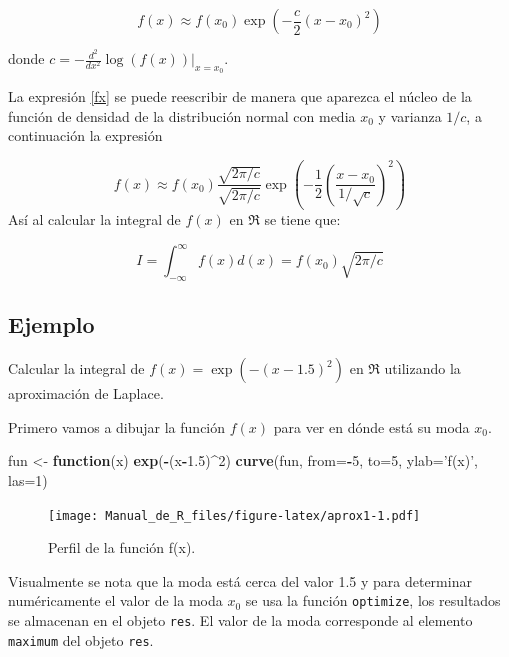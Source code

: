 \documentclass[10pt,]{krantz}
\makeatletter
\newenvironment{Shaded}{\begin{snugshade}}{\end{snugshade}}
\newcommand{\KeywordTok}[1]{\textcolor[rgb]{0.13,0.29,0.53}{\textbf{#1}}}
\newcommand{\DataTypeTok}[1]{\textcolor[rgb]{0.13,0.29,0.53}{#1}}
\newcommand{\DecValTok}[1]{\textcolor[rgb]{0.00,0.00,0.81}{#1}}
\newcommand{\FloatTok}[1]{\textcolor[rgb]{0.00,0.00,0.81}{#1}}
\newcommand{\StringTok}[1]{\textcolor[rgb]{0.31,0.60,0.02}{#1}}
\newcommand{\ControlFlowTok}[1]{\textcolor[rgb]{0.13,0.29,0.53}{\textbf{#1}}}
\newcommand{\OperatorTok}[1]{\textcolor[rgb]{0.81,0.36,0.00}{\textbf{#1}}}
\newcommand{\NormalTok}[1]{#1}
\newenvironment{kframe}{%
\medskip{}
\setlength{\fboxsep}{.8em}
 \def\at@end@of@kframe{}%
 \ifinner\ifhmode%
  \def\at@end@of@kframe{\end{minipage}}%
  \begin{minipage}{\columnwidth}%
 \fi\fi%
 \def\FrameCommand##1{\hskip\@totalleftmargin \hskip-\fboxsep
 \colorbox{shadecolor}{##1}\hskip-\fboxsep
     \hskip-\linewidth \hskip-\@totalleftmargin \hskip\columnwidth}%
 \MakeFramed {\advance\hsize-\width
   \@totalleftmargin\z@ \linewidth\hsize
   \@setminipage}}%
 {\par\unskip\endMakeFramed%
 \at@end@of@kframe}
\renewenvironment{Shaded}{\begin{kframe}}{\end{kframe}}
\makeatother
\begin{document}
\begin{equation} \label{fx}
f(x) \approx f(x_0)  \exp \left( -\frac{c}{2} (x-x_0)^2 \right)
\end{equation}

donde \(c=-\frac{d^2}{dx^2} \log(f(x)) \bigg|_{x=x_0}\).

La expresión \ref{fx} se puede reescribir de manera que aparezca el
núcleo de la función de densidad de la distribución normal con media
\(x_0\) y varianza \(1/c\), a continuación la expresión

\[
f(x) \approx f(x_0) \frac{\sqrt{2 \pi / c}}{\sqrt{2 \pi / c}}  \exp \left( -\frac{1}{2} \left( \frac{x-x_0}{1/\sqrt{c}} \right)^2 \right)
\] Así al calcular la integral de \(f(x)\) en \(\Re\) se tiene que:

\begin{equation} \label{aprox_laplace}
I = \int_{-\infty}^{\infty} f(x) d(x) = f(x_0) \sqrt{2 \pi / c}
\end{equation}

\subsection*{Ejemplo}\label{ejemplo-75}


Calcular la integral de \(f(x)=\exp \left( -(x-1.5)^2 \right)\) en
\(\Re\) utilizando la aproximación de Laplace.

Primero vamos a dibujar la función \(f(x)\) para ver en dónde está su
moda \(x_0\).

\begin{Shaded}
\begin{Highlighting}[]
\NormalTok{fun <-}\StringTok{ }\ControlFlowTok{function}\NormalTok{(x) }\KeywordTok{exp}\NormalTok{(}\OperatorTok{-}\NormalTok{(x}\OperatorTok{-}\FloatTok{1.5}\NormalTok{)}\OperatorTok{^}\DecValTok{2}\NormalTok{)}
\KeywordTok{curve}\NormalTok{(fun, }\DataTypeTok{from=}\OperatorTok{-}\DecValTok{5}\NormalTok{, }\DataTypeTok{to=}\DecValTok{5}\NormalTok{, }\DataTypeTok{ylab=}\StringTok{'f(x)'}\NormalTok{, }\DataTypeTok{las=}\DecValTok{1}\NormalTok{)}
\end{Highlighting}
\end{Shaded}

\begin{figure}
\centering
\texttt{[image: Manual\_de\_R\_files/figure-latex/aprox1-1.pdf]}
\caption{\label{fig:aprox1}Perfil de la función f(x).}
\end{figure}

Visualmente se nota que la moda está cerca del valor 1.5 y para
determinar numéricamente el valor de la moda \(x_0\) se usa la función
\texttt{optimize}, los resultados se almacenan en el objeto
\texttt{res}. El valor de la moda corresponde al elemento
\texttt{maximum} del objeto \texttt{res}.
\end{document}
